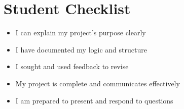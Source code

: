 \documentclass[11pt]{article}
\begin{document}
\section*{Student Checklist}
\begin{itemize}[leftmargin=*]
  \item [ ] I can explain my project's purpose clearly
  \item [ ] I have documented my logic and structure
  \item [ ] I sought and used feedback to revise
  \item [ ] My project is complete and communicates effectively
  \item [ ] I am prepared to present and respond to questions
\end{itemize}
\end{document}
